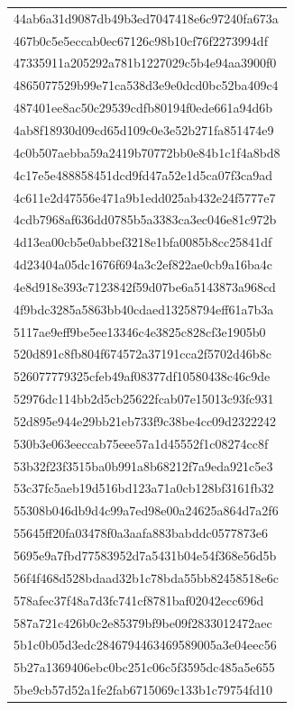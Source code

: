 \begin{tabular}{l}
44ab6a31d9087db49b3ed7047418e6c97240fa673a \\
467b0c5e5eccab0ec67126c98b10cf76f2273994df \\
47335911a205292a781b1227029c5b4e94aa3900f0 \\
4865077529b99e71ca538d3e9e0dcd0bc52ba409c4 \\
487401ee8ac50c29539cdfb80194f0ede661a94d6b \\
4ab8f18930d09cd65d109c0e3e52b271fa851474e9 \\
4c0b507aebba59a2419b70772bb0e84b1c1f4a8bd8 \\
4c17e5e488858451dcd9fd47a52e1d5ca07f3ca9ad \\
4c611e2d47556e471a9b1edd025ab432e24f5777e7 \\
4cdb7968af636dd0785b5a3383ca3ec046e81c972b \\
4d13ea00cb5e0abbef3218e1bfa0085b8cc25841df \\
4d23404a05dc1676f694a3c2ef822ae0cb9a16ba4c \\
4e8d918e393c7123842f59d07be6a5143873a968cd \\
4f9bdc3285a5863bb40cdaed13258794eff61a7b3a \\
5117ae9eff9be5ee13346c4e3825c828cf3e1905b0 \\
520d891c8fb804f674572a37191cca2f5702d46b8c \\
526077779325cfeb49af08377df10580438c46c9de \\
52976dc114bb2d5cb25622fcab07e15013c93fc931 \\
52d895e944e29bb21eb733f9c38be4cc09d2322242 \\
530b3e063eeccab75eee57a1d45552f1c08274cc8f \\
53b32f23f3515ba0b991a8b68212f7a9eda921c5e3 \\
53c37fc5aeb19d516bd123a71a0cb128bf3161fb32 \\
55308b046db9d4c99a7ed98e00a24625a864d7a2f6 \\
55645ff20fa03478f0a3aafa883babddc0577873e6 \\
5695e9a7fbd77583952d7a5431b04e54f368e56d5b \\
56f4f468d528bdaad32b1c78bda55bb82458518e6c \\
578afec37f48a7d3fc741cf8781baf02042ecc696d \\
587a721c426b0c2e85379bf9be09f2833012472aec \\
5b1c0b05d3edc2846794463469589005a3e04eec56 \\
5b27a1369406ebc0bc251c06c5f3595dc485a5e655 \\
5be9cb57d52a1fe2fab6715069c133b1c79754fd10 \\

\end{tabular}
